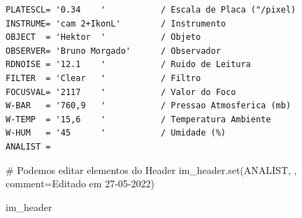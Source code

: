 \documentclass[
  letterpaper,
  DIV=11,
  numbers=noendperiod]{scrreprt}
\newenvironment{Shaded}{\begin{snugshade}}{\end{snugshade}}
\newcommand{\BuiltInTok}[1]{\textcolor[rgb]{0.00,0.23,0.31}{#1}}
\newcommand{\CommentTok}[1]{\textcolor[rgb]{0.37,0.37,0.37}{#1}}
\newcommand{\NormalTok}[1]{\textcolor[rgb]{0.00,0.23,0.31}{#1}}
\newcommand{\OperatorTok}[1]{\textcolor[rgb]{0.37,0.37,0.37}{#1}}
\newcommand{\StringTok}[1]{\textcolor[rgb]{0.13,0.47,0.30}{#1}}
\begin{document}
\begin{verbatim}
PLATESCL= '0.34    '           / Escala de Placa ("/pixel)                      
INSTRUME= 'cam 2+IkonL'        / Instrumento                                    
OBJECT  = 'Hektor  '           / Objeto                                         
OBSERVER= 'Bruno Morgado'      / Observador                                     
RDNOISE = '12.1    '           / Ruido de Leitura                               
FILTER  = 'Clear   '           / Filtro                                         
FOCUSVAL= '2117    '           / Valor do Foco                                  
W-BAR   = '760,9   '           / Pressao Atmosferica (mb)                       
W-TEMP  = '15,6    '           / Temperatura Ambiente                           
W-HUM   = '45      '           / Umidade (%)                                    
ANALIST =                                                                       
\end{verbatim}

\begin{Shaded}
\begin{Highlighting}[]
\CommentTok{\# Podemos editar elementos do Header}
\NormalTok{im\_header.}\BuiltInTok{set}\NormalTok{(}\StringTok{\textquotesingle{}ANALIST\textquotesingle{}}\NormalTok{, }\StringTok{\textquotesingle{}\textquotesingle{}}\NormalTok{, comment}\OperatorTok{=}\StringTok{\textquotesingle{}Editado em 27{-}05{-}2022\textquotesingle{}}\NormalTok{)}
\end{Highlighting}
\end{Shaded}

\begin{Shaded}
\begin{Highlighting}[]
\NormalTok{im\_header}
\end{Highlighting}
\end{Shaded}
\end{document}
